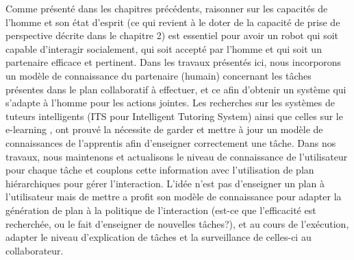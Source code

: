 \documentclass[a4paper,11pt,twoside]{StyleThese}
\begin{document}
Comme présenté dans les chapitres précédents, raisonner sur les capacités de l'homme et son état d'esprit (ce qui revient à le doter de la capacité de prise de perspective décrite dans le chapitre 2) est essentiel pour avoir un robot qui soit capable d'interagir socialement, qui soit accepté par l'homme et qui soit un partenaire efficace et pertinent.
Dans les travaux présentés ici, nous incorporons un modèle de connaissance du partenaire (humain) concernant les tâches présentes dans le plan collaboratif à effectuer, et ce afin d'obtenir un système qui s'adapte à l'homme pour les actions jointes.
Les recherches sur les systèmes de tuteurs intelligents (ITS pour Intelligent Tutoring System) \cite{brusilovskiy1994construction} ainsi que celles sur le e-learning \cite{brusilovskiy2005}, ont prouvé la nécessite de garder et mettre à jour un modèle de connaissances de l'apprentis afin d'enseigner correctement une tâche.
%
Dans nos travaux, nous maintenons et actualisons le niveau de connaissance de l'utilisateur pour chaque tâche et couplons cette information avec l'utilisation de plan hiérarchiques pour gérer l'interaction. L'idée n'est pas d'enseigner un plan à l'utilisateur mais de mettre a profit son modèle de connaissance pour adapter la génération de plan à la politique de l'interaction (est-ce que l'efficacité est recherchée, ou le fait d'enseigner de nouvelles tâches?), et au cours de l'exécution, adapter le niveau d'explication de tâches et la surveillance de celles-ci au collaborateur.
%
\end{document}

